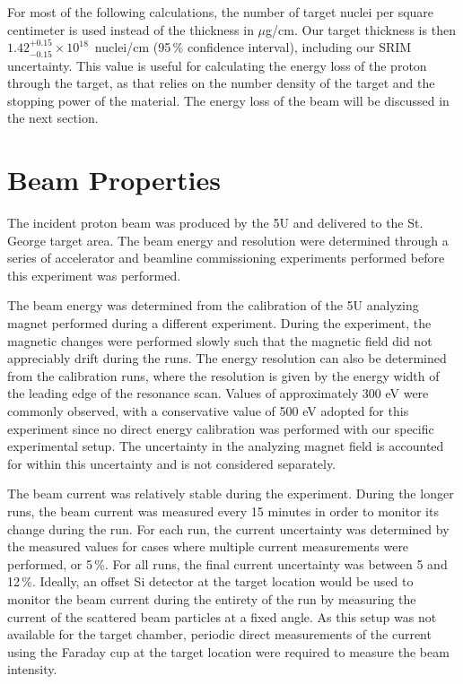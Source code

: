 For most of the following calculations, the number of target nuclei per
square centimeter is used instead of the thickness in $\mu$g/cm\squared{}. Our
target thickness is then $1.42^{+0.15}_{-0.15} \times 10^{18}$~nuclei/cm\squared{}
(95\,\% confidence interval), including our SRIM uncertainty.
This value is useful for calculating the energy loss of the proton
through the target, as that relies on the number density of the target
and the stopping power of the material. The energy loss of the beam will
be discussed in the next section.


\section{Beam Properties}
\label{sec:beam-properties}

The incident proton beam was produced by the 5U and delivered to the St.
George target area. The beam energy and resolution were determined
through a series of accelerator and beamline commissioning experiments
performed before this experiment was performed.


The beam energy was determined from the calibration of the 5U analyzing
magnet performed during a different experiment. During the experiment,
the magnetic changes were performed slowly such that the magnetic field
did not appreciably drift during the runs. The energy resolution can
also be determined from the calibration runs, where the resolution is
given by the energy width of the leading edge of the resonance scan.
Values of approximately 300 eV were commonly observed, with a
conservative value of 500 eV adopted for this experiment since no direct
energy calibration was performed with our specific experimental setup.
The uncertainty in the analyzing magnet field is accounted for within
this uncertainty and is not considered separately.


The beam current was relatively stable during the experiment. During the
longer runs, the beam current was measured every 15 minutes in order to
monitor its change during the run. For each run, the current uncertainty
was determined by the measured values for cases where multiple current
measurements were performed, or 5\,\%. For all runs, the final current
uncertainty was between 5 and 12\,\%. Ideally, an offset Si detector at
the target location would be used to monitor the beam current during the
entirety of the run by measuring the current of the scattered beam
particles at a fixed angle. As this setup was not available for the
target chamber, periodic direct measurements of the current using the
Faraday cup at the target location were required to measure the beam
intensity.


